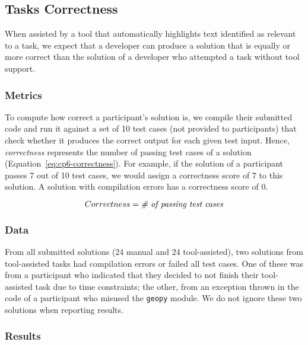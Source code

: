
\subsection{Tasks Correctness}
\label{cp6:correctness}



When assisted by a tool that automatically highlights text identified as relevant to a task, we expect that a developer can produce a solution 
that is equally or more correct than the solution of a developer who attempted a task without tool support. 


\subsubsection{Metrics}

To compute how correct a participant's solution is, 
we compile their submitted code and run it against a set of 10 test cases (not provided to participants) that check whether it produces the correct output for each given test input. 
Hence, \textit{correctness} represents the number of passing test cases of a solution (Equation~\ref{eq:cp6-correctness}).
For example, if the solution of a participant passes 7 out of 10 test cases, we would assign a 
correctness score of $7$ to this solution. 
A solution with compilation errors has a correctness score of $0$.


\begin{small}
\begin{equation}
    Correctness = \text{\textit{\# of passing test cases}}
    \label{eq:cp6-correctness}
\end{equation}
\end{small}



\subsubsection{Data}

From all submitted solutions (24 manual and 24 tool-assisted), two 
solutions from tool-assisted tasks had compilation errors or failed all test cases. 
One of these
was from a participant who indicated that they decided to not finish their tool-assisted task due to time constraints; 
the other, from an exception thrown in the code of a participant who misused the \texttt{geopy} module. We do not ignore these two solutions when reporting results.



\subsubsection{Results}


